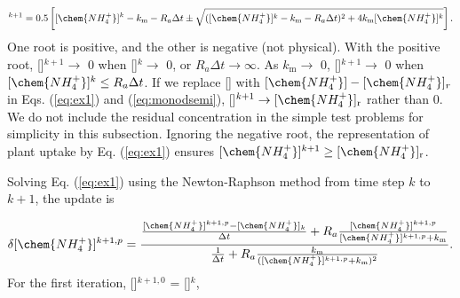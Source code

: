 \documentclass[gmd, manuscript]{copernicus}
\begin{document}
\begin{equation}
[\chem{NH_4^+}]^{k+1}=0.5 \left[[\chem{NH_4^+}]^k - k_\text{m} - R_a \Delta t
\pm \sqrt{([\chem{NH_4^+}]^k - k_\text{m} - R_a\Delta t)^2 + 4
k_\text{m}[\chem{NH_4^+}]^k}\right].
\label{eq:monodsemi}
\end{equation}
One root is positive, and the other is negative (not physical). With the
positive root, []$^{k+1}\rightarrow$ 0 when []$^k
\rightarrow$ 0, or $R_a\Delta t \rightarrow \infty$. As $k_\text{m}\rightarrow$
0, []$^{k+1}\rightarrow$ 0 when $[\chem{NH_4^+}]^k \leq R_a \Delta
t$. If we replace [] with $[\chem{NH_4^+}]-[\chem{NH_4^+}]_r$ in
Eqs. (\ref{eq:ex1}) and (\ref{eq:monodsemi}), []$^{k+1} \rightarrow
[\chem{NH_4^+}]_\text{r}$ rather than 0. We do not include the
residual concentration in the simple test problems for simplicity in this
subsection. Ignoring the negative root, the representation of
plant  uptake by Eq. (\ref{eq:ex1}) ensures $[\chem{NH_4^+}]^{k+1}
\geq [\chem{NH_4^+}]_\text{r}$. 

Solving Eq. (\ref{eq:ex1}) using the Newton-Raphson method from time step $k$
to $k+1$, the update is 

\begin{equation}
\delta [\chem{NH_4^+}]^{k+1,p} =
\frac{\frac{[\chem{NH_4^+}]^{k+1,p}-[\chem{NH_4^+}]_k} {\Delta t}+R_a
\frac{[\chem{NH_4^+}]^{k+1,p}}{[\chem{NH_4^+}]^{k+1,p}+k_\text{m}}}{\frac{1}{\Delta
t} + R_a \frac{k_\text{m}}{([\chem{NH_4^+}]^{k+1,p}+k_\text{m})^2}}.
\end{equation}
For the first iteration, []$^{k+1,0}$ = []$^k$, 
\end{document}
